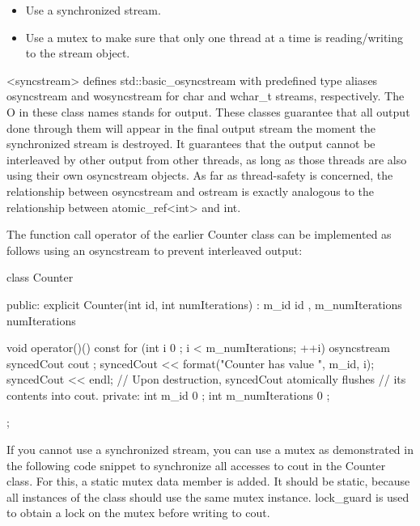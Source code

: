 \begin{itemize}
\item
Use a synchronized stream.

\item
Use a mutex to make sure that only one thread at a time is reading/writing to the stream object.
\end{itemize}


<syncstream> defines std::basic\_osyncstream with predefined type aliases osyncstream and wosyncstream for char and wchar\_t streams, respectively. The O in these class names stands for output. These classes guarantee that all output done through them will appear in the final output stream the moment the synchronized stream is destroyed. It guarantees that the output cannot be interleaved by other output from other threads, as long as those threads are also using their own osyncstream objects. As far as thread-safety is concerned, the relationship between osyncstream and ostream is exactly analogous to the relationship between atomic\_ref<int> and int.

The function call operator of the earlier Counter class can be implemented as follows using an osyncstream to prevent interleaved output:

\begin{cpp}
class Counter
{
    public:
        explicit Counter(int id, int numIterations)
            : m_id { id }, m_numIterations { numIterations } { }

        void operator()() const
        {
            for (int i { 0 }; i < m_numIterations; ++i) {
                osyncstream syncedCout { cout };
                syncedCout << format("Counter {} has value {}", m_id, i);
                syncedCout << endl;
                // Upon destruction, syncedCout atomically flushes
                // its contents into cout.
            }
        }
    private:
        int m_id { 0 };
        int m_numIterations { 0 };
};
\end{cpp}


If you cannot use a synchronized stream, you can use a mutex as demonstrated in the following code snippet to synchronize all accesses to cout in the Counter class. For this, a static mutex data member is added. It should be static, because all instances of the class should use the same mutex instance. lock\_guard is used to obtain a lock on the mutex before writing to cout.

